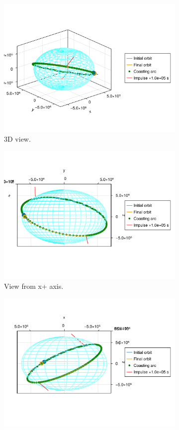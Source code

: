 \begin{figure}[htbp]
    \centering
    \begin{subfigure}{0.49\linewidth}
        \includegraphics[width=0.8\linewidth]{../results/j2/ipv_noncop/CICIC_3d.png}
        \caption{3D view.}
    \end{subfigure}
    \begin{subfigure}{0.49\linewidth}
        \includegraphics[width=0.8\linewidth]{../results/j2/ipv_noncop/CICIC_x+.png}
        \caption{View from x+ axis.}
    \end{subfigure}
    \begin{subfigure}{0.49\linewidth}
        \includegraphics[width=0.8\linewidth]{../results/j2/ipv_noncop/CICIC_y+.png}

\end{subfigure}
\end{figure}

